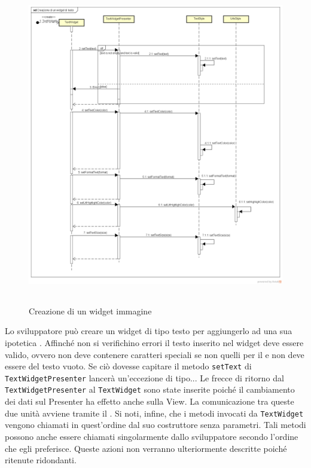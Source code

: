 \label{Creazione di un widget di testo}
\begin{figure}[ht]
	\centering
	\includegraphics[width=16cm, height=14cm]{Sezioni/Diagrammi/img/Creazione di un widget di testo.png}
	\caption{Creazione di un widget immagine}
\end{figure}

Lo sviluppatore può creare un widget di tipo testo per aggiungerlo ad una sua ipotetica . Affinché non si verifichino errori il testo inserito nel widget deve essere valido, ovvero non deve contenere caratteri speciali se non quelli per il  e non deve essere del testo vuoto. Se ciò dovesse capitare il metodo \texttt{setText} di \texttt{TextWidgetPresenter} lancerà un'eccezione di tipo...
Le frecce di ritorno dal \texttt{TextWidgetPresenter}  al \texttt{TextWidget} sono state inserite poiché il cambiamento dei dati sul Presenter ha effetto anche sulla View. La comunicazione tra queste due unità avviene tramite il  .
Si noti, infine, che i metodi invocati da \texttt{TextWidget} vengono chiamati in quest'ordine dal suo costruttore senza parametri. Tali metodi possono anche essere chiamati singolarmente dallo sviluppatore secondo l'ordine che egli preferisce. Queste azioni non verranno ulteriormente descritte poiché ritenute ridondanti.

